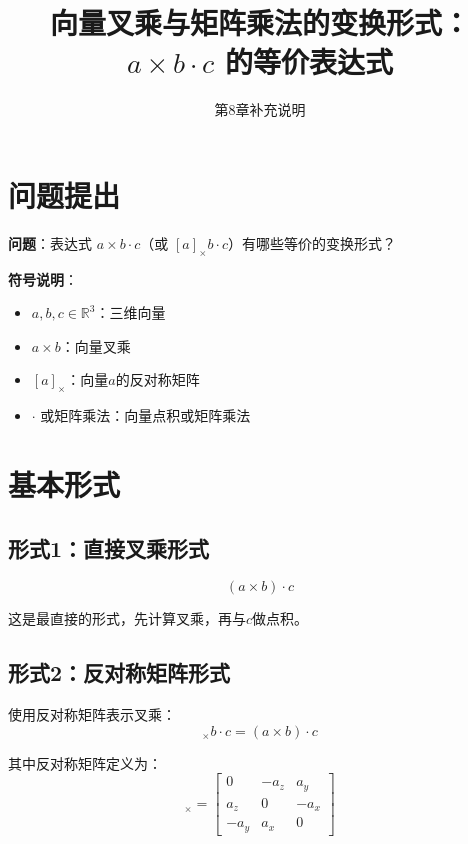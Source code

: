 \documentclass[12pt,a4paper]{article}
\title{向量叉乘与矩阵乘法的变换形式：$a \times b \cdot c$ 的等价表达式}
\author{第8章补充说明}
\date{}
\begin{document}
\maketitle

\section{问题提出}

\textbf{问题}：表达式 $a \times b \cdot c$（或 $[a]_{\times} b \cdot c$）有哪些等价的变换形式？

\textbf{符号说明}：
\begin{itemize}
\item $a, b, c \in \mathbb{R}^3$：三维向量
\item $a \times b$：向量叉乘
\item $[a]_{\times}$：向量$a$的反对称矩阵
\item $\cdot$ 或矩阵乘法：向量点积或矩阵乘法
\end{itemize}

\section{基本形式}

\subsection{形式1：直接叉乘形式}

\begin{equation}
(a \times b) \cdot c
\end{equation}

这是最直接的形式，先计算叉乘，再与$c$做点积。

\subsection{形式2：反对称矩阵形式}

使用反对称矩阵表示叉乘：
\begin{equation}
[a]_{\times} b \cdot c = (a \times b) \cdot c
\end{equation}

其中反对称矩阵定义为：
\begin{equation}
[a]_{\times} = \begin{bmatrix}
0 & -a_z & a_y \\
a_z & 0 & -a_x \\
-a_y & a_x & 0
\end{bmatrix}
\end{equation}
\end{document}
